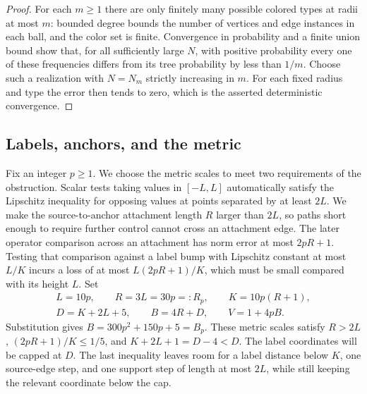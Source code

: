 \begin{proof}
For each $m\ge1$ there are only finitely many possible colored types at
radii at most $m$: bounded degree bounds the number of vertices and edge
instances in each ball, and the color set is finite. Convergence in
probability and a finite union bound show that, for all sufficiently large
$N$, with positive probability every one of these frequencies differs from
its tree probability by less than $1/m$. Choose such a realization with
$N=N_m$ strictly increasing in $m$. For each fixed radius and type the error
then tends to zero, which is the asserted deterministic convergence.
\end{proof}

\subsection{Labels, anchors, and the metric}

Fix an integer $p\ge1$. We choose the metric scales to meet two requirements
of the obstruction. Scalar tests taking values in $[-L,L]$ automatically
satisfy the Lipschitz inequality for opposing values at points separated by
at least $2L$. We make the source-to-anchor attachment length $R$ larger
than $2L$, so paths short enough to require further control cannot cross an
attachment edge. The later operator comparison across an attachment has
norm error at most $2pR+1$. Testing that comparison against a label bump
with Lipschitz constant at most $L/K$ incurs a loss of at most
$L(2pR+1)/K$, which must be small compared with its height $L$.
Set
\begin{equation}\label{eq:parameters}
 \begin{gathered}
 L=10p,\qquad R=3L=30p=:R_p,\qquad K=10p(R+1),\\
 D=K+2L+5,\qquad B=4R+D,\qquad V=1+4pB.
 \end{gathered}
\end{equation}
Substitution gives $B=300p^2+150p+5=B_p$. These metric scales satisfy
$R>2L$, $(2pR+1)/K\le1/5$, and $K+2L+1=D-4<D$. The label coordinates
will be capped at $D$. The last inequality leaves room for a label distance
below $K$, one source-edge step, and one support step of length at most
$2L$, while still keeping the relevant coordinate below the cap.

